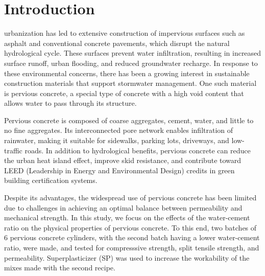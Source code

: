 \documentclass{ieeeaccess}
\begin{document}
\titlepgskip=-21pt

\maketitle

\section{Introduction}
\label{sec:introduction}
 urbanization has led to extensive construction of impervious 
surfaces such as asphalt and conventional concrete pavements, which disrupt the 
natural hydrological cycle. These surfaces prevent water infiltration, resulting 
in increased surface runoff, urban flooding, and reduced groundwater recharge. 
In response to these environmental concerns, there has been a growing interest 
in sustainable construction materials that support stormwater management. One 
such material is pervious concrete, a special type of concrete with a high void 
content that allows water to pass through its structure. 

Pervious concrete is composed of coarse aggregates, cement, water, and little to 
no fine aggregates. Its interconnected pore network enables infiltration of 
rainwater, making it suitable for sidewalks, parking lots, driveways, and 
low-traffic roads. In addition to hydrological benefits, pervious concrete can 
reduce the urban heat island effect, improve skid resistance, and contribute 
toward LEED (Leadership in Energy and Environmental Design) credits in green 
building certification systems. 

Despite its advantages, the widespread use of pervious concrete has been limited 
due to challenges in achieving an optimal balance between permeability and 
mechanical strength. In this study, we focus on the effects of the  water-cement 
ratio on the physical properties of pervious concrete. To this end, two batches 
of 6 pervious concrete cylinders, with the second batch having a lower 
water-cement ratio, were made, and tested for compresssive strength, split 
tensile strength, and permeability. Superplasticizer (SP) was used to increase 
the workability of the mixes made with the second recipe. 
\end{document}
